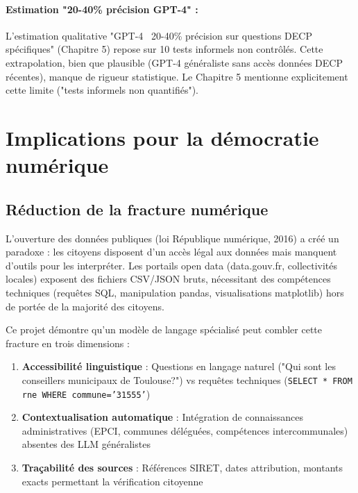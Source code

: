\paragraph{Estimation "20-40\% précision GPT-4" :}
L'estimation qualitative "GPT-4 ~20-40\% précision sur questions DECP spécifiques" (Chapitre 5) repose sur 10 tests informels non contrôlés. Cette extrapolation, bien que plausible (GPT-4 généraliste sans accès données DECP récentes), manque de rigueur statistique. Le Chapitre 5 mentionne explicitement cette limite ("tests informels non quantifiés").

\section{Implications pour la démocratie numérique}

\subsection{Réduction de la fracture numérique}

L'ouverture des données publiques (loi République numérique, 2016) a créé un paradoxe : les citoyens disposent d'un accès légal aux données mais manquent d'outils pour les interpréter. Les portails open data (data.gouv.fr, collectivités locales) exposent des fichiers CSV/JSON bruts, nécessitant des compétences techniques (requêtes SQL, manipulation pandas, visualisations matplotlib) hors de portée de la majorité des citoyens.

Ce projet démontre qu'un modèle de langage spécialisé peut combler cette fracture en trois dimensions :

\begin{enumerate}
    \item \textbf{Accessibilité linguistique} : Questions en langage naturel ("Qui sont les conseillers municipaux de Toulouse?") vs requêtes techniques (\texttt{SELECT * FROM rne WHERE commune='31555'})
    
    \item \textbf{Contextualisation automatique} : Intégration de connaissances administratives (EPCI, communes déléguées, compétences intercommunales) absentes des LLM généralistes
    
    \item \textbf{Traçabilité des sources} : Références SIRET, dates attribution, montants exacts permettant la vérification citoyenne
\end{enumerate}

